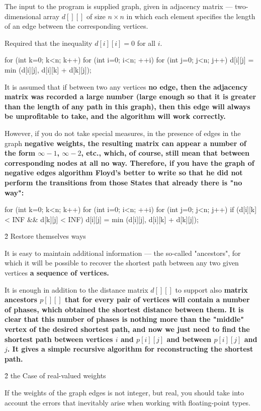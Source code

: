 The input to the program is supplied graph, given in adjacency matrix --- two-dimensional array $d[][]$ of size $n \times n$ in which each element specifies the length of an edge between the corresponding vertices.

Required that the inequality $d[i][i] = 0$ for all $i$.

\code
for (int k=0; k<n; k++)
for (int i=0; i<n; ++i)
for (int j=0; j<n; j++)
d[i][j] = min (d[i][j], d[i][k] + d[k][j]);
\endcode

It is assumed that if between two any vertices \bf{no edge}, then the adjacency matrix was recorded a large number (large enough so that it is greater than the length of any path in this graph), then this edge will always be unprofitable to take, and the algorithm will work correctly.

However, if you do not take special measures, in the presence of edges in the graph \bf{negative weights}, the resulting matrix can appear a number of the form $\infty-1$, $\infty-2$, etc., which, of course, still mean that between corresponding nodes at all no way. Therefore, if you have the graph of negative edges algorithm Floyd's better to write so that he did not perform the transitions from those States that already there is "no way":

\code
for (int k=0; k<n; k++)
for (int i=0; i<n; ++i)
for (int j=0; j<n; j++)
if (d[i][k] < INF && d[k][j] < INF)
d[i][j] = min (d[i][j], d[i][k] + d[k][j]);
\endcode


\h2{ Restore themselves ways }

It is easy to maintain additional information --- the so-called "ancestors", for which it will be possible to recover the shortest path between any two given vertices \bf{a sequence of vertices}.

It is enough in addition to the distance matrix $d[][]$ to support also \bf{matrix ancestors} $p [] []$ that for every pair of vertices will contain a number of phases, which obtained the shortest distance between them. It is clear that this number of phases is nothing more than the "middle" vertex of the desired shortest path, and now we just need to find the shortest path between vertices $i$ and $p[i][j]$ and between $p[i][j]$ and $j$. It gives a simple recursive algorithm for reconstructing the shortest path.


\h2{ the Case of real-valued weights }

If the weights of the graph edges is not integer, but real, you should take into account the errors that inevitably arise when working with floating-point types.

